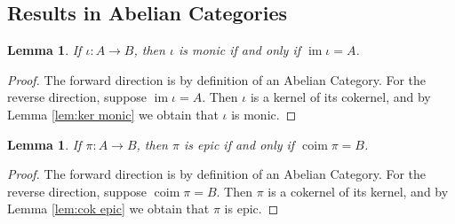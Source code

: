 \documentclass{article}
\DeclareMathOperator{\im}{\mathrm{im}}
\DeclareMathOperator{\coim}{\mathrm{coim}}
\newtheorem{lemma}[theorem]{Lemma}
\begin{document}
\subsection*{Results in Abelian Categories}
\begin{lemma}\label{lem:monic iff im is source}
    If $\iota:A\to B$, then $\iota$ is monic if and only if $\im \iota=A$.
\end{lemma}
\begin{proof}
    The forward direction is by definition of an Abelian Category. For the reverse direction, suppose $\im \iota=A$. Then $\iota$ is a kernel of its cokernel, and by Lemma \ref{lem:ker monic} we obtain that $\iota$ is monic.
\end{proof}
\begin{lemma}\label{lem:epic iff coim is target}
    If $\pi: A\to B$, then $\pi$ is epic if and only if $\coim \pi =B$.
\end{lemma}
\begin{proof}
    The forward direction is by definition of an Abelian Category. For the reverse direction, suppose $\coim \pi=B$. Then $\pi$ is a cokernel of its kernel, and by Lemma \ref{lem:cok epic} we obtain that $\pi$ is epic.
\end{proof}
\end{document}
